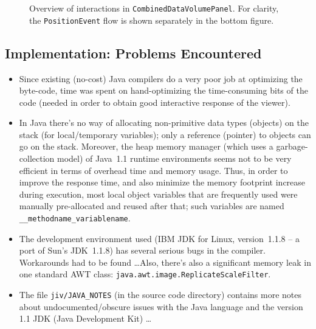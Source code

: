 \documentclass[11pt]{article}
\begin{document}
\begin{figure}[p]
\begin{center}
\end{center}
\caption[Overview of interactions in
\texttt{CombinedDataVolumePanel}]{Overview of interactions in
  \texttt{CombinedDataVolumePanel}.  For clarity, the
  \mbox{\texttt{PositionEvent}} flow is shown separately in the bottom
  figure.}
\label{fig:CombinedDataVolumePanel}
\end{figure}


\subsection{Implementation: Problems Encountered}
\label{sec:problems-encountered}

\begin{itemize}
\item Since existing (no-cost) Java compilers do a very poor job at
  optimizing the byte-code, time was spent on hand-optimizing the
  time-consuming bits of the code (needed in order to obtain good
  interactive response of the viewer).
\item In Java there's no way of allocating non-primitive data types
  (objects) on the stack (for local/temporary variables); only a
  reference (pointer) to objects can go on the stack. Moreover, the
  heap memory manager (which uses a garbage-collection model) of
  Java~1.1 runtime environments seems not to be very efficient in
  terms of overhead time and memory usage. Thus, in order to improve
  the response time, and also minimize the memory footprint increase
  during execution, most local object variables that are frequently
  used were manually pre-allocated and reused after that; such
  variables are named \verb+__methodname_variablename+.
\item The development environment used (IBM JDK for Linux,
  version~1.1.8 -- a port of Sun's JDK~1.1.8) has several serious bugs
  in the compiler.  Workarounds had to be found \ldots Also, there's
  also a significant memory leak in one standard AWT class: 
  \verb+java.awt.image.ReplicateScaleFilter+.
  
\item The file \verb+jiv/JAVA_NOTES+ (in the source code directory)
  contains more notes about undocumented/obscure issues with the Java
  language and the version 1.1 JDK (Java Development Kit) \ldots

\end{itemize}
\end{document}
